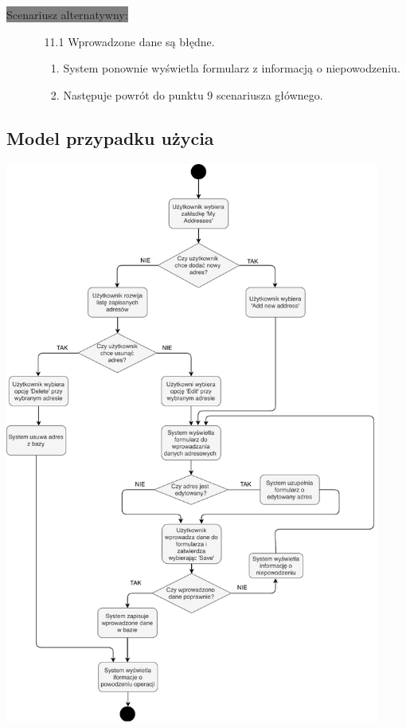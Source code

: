 \documentclass[12pt]{report}
\begin{document}
	\colorbox{grey}{Scenariusz alternatywny:}
	\begin{enumerate}\addtocounter{enumi}{6}
		\item[]
		\begin{enumerate}
			\item[11.1] Wprowadzone dane są błędne.
			\begin{enumerate}
				\item System ponownie wyświetla formularz z informacją o niepowodzeniu.
				\item Następuje powrót do punktu 9 scenariusza głównego.
			\end{enumerate}
		\end{enumerate}
	\end{enumerate}
	
	\subsection{Model przypadku użycia}
	\begin{center}
		\includegraphics[width=350pt]{ustawienia.pdf}
	\end{center}
	\newpage
	
\end{document}
